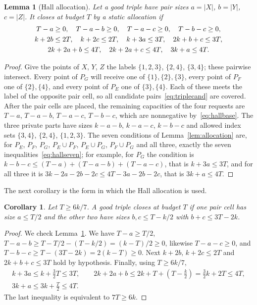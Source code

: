 \documentclass[11pt]{article}
\numberwithin{equation}{section}
\newtheorem{lemma}[theorem]{Lemma}
\newtheorem{corollary}[theorem]{Corollary}
\theoremstyle{definition}
\theoremstyle{remark}
\begin{document}
\begin{lemma}[Hall allocation]\label{lem:hall}
Let a good triple have pair sizes $a=|X|$, $b=|Y|$, $c=|Z|$. It closes at
budget $T$ by a static allocation if
\begin{gather}
 T-a\ge0,\quad T-a-b\ge0,\quad T-a-c\ge0,\quad T-b-c\ge0,\label{eq:hallbase}\\
 k+2b\le2T,\quad k+2c\le2T,\quad k+3a\le3T,\quad 2k+b+c\le3T,\label{eq:hallseven}\\
 2k+2a+b\le4T,\quad 2k+2a+c\le4T,\quad 3k+a\le4T.\notag
\end{gather}
\end{lemma}
\begin{proof}
Give the points of $X$, $Y$, $Z$ the labels $\{1,2,3\}$, $\{2,4\}$,
$\{3,4\}$; these pairwise intersect. Every point of $P_G$ will receive
one of $\{1\},\{2\},\{3\}$, every point of $P_F$ one of $\{2\},\{4\}$,
and every point of $P_E$ one of $\{3\},\{4\}$. Each of these meets the
label of the opposite pair cell, so all candidate
pairs~\eqref{eq:triplecand} are covered. After the pair cells are placed,
the remaining capacities of the four requests are $T-a$, $T-a-b$,
$T-a-c$, $T-b-c$, which are nonnegative by~\eqref{eq:hallbase}. The
three private parts have sizes $k-a-b$, $k-a-c$, $k-b-c$ and allowed
index sets $\{3,4\}$, $\{2,4\}$, $\{1,2,3\}$. The seven conditions of
Lemma~\ref{lem:allocation} are, for $P_E$, $P_F$, $P_G$, $P_E\cup P_F$,
$P_E\cup P_G$, $P_F\cup P_G$ and all three, exactly the seven
inequalities~\eqref{eq:hallseven}; for example, for $P_G$ the condition
is $k-b-c\le(T-a)+(T-a-b)+(T-a-c)$, that is $k+3a\le3T$, and for all
three it is $3k-2a-2b-2c\le4T-3a-2b-2c$, that is $3k+a\le4T$.
\end{proof}

The next corollary is the form in which the Hall allocation is used.

\begin{corollary}\label{cor:hall}
Let $T\ge6k/7$. A good triple closes at budget $T$ if one pair cell has
size $a\le T/2$ and the other two have sizes $b,c\le T-k/2$ with
$b+c\le3T-2k$.
\end{corollary}
\begin{proof}
We check Lemma~\ref{lem:hall}. We have $T-a\ge T/2$,
$T-a-b\ge T-T/2-(T-k/2)=(k-T)/2\ge0$, likewise $T-a-c\ge0$, and
$T-b-c\ge T-(3T-2k)=2(k-T)\ge0$. Next $k+2b,\,k+2c\le2T$ and $2k+b+c\le3T$
hold by hypothesis. Finally, using $T\ge6k/7$,
\begin{gather*}
 k+3a\le k+\tfrac32T\le3T,\qquad
 2k+2a+b\le2k+T+(T-\tfrac k2)=\tfrac32k+2T\le4T,\\
 3k+a\le3k+\tfrac T2\le4T .
\end{gather*}
The last inequality is equivalent to $7T\ge6k$.
\end{proof}
\end{document}
